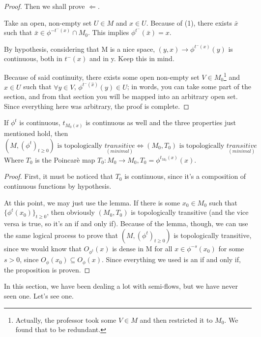 \begin{proof}
    Then we shall prove $\Leftarrow$.

    Take an open, non-empty set $U\in M$ and $x\in U$. Because of (1), there exists $\bar{x}$ such that $\bar{x}\in \phi^{-t^-(x)}\cap M_0$. This implies $\phi^{t^-}(\bar{x})=x$. 
    
    By hypothesis, considering that M is a nice space, $(y,x)\rightarrow\phi^{t^-(x)}(y)$ is continuous, both in $t^-(x)$ and in y. Keep this in mind.

    Because of said continuity, there exists some open non-empty set $V\in M_0$\footnote{Actually, the professor took some $V\in M$ and then restricted it to $M_0$. We found that to be redundant.} and $\hat{x}\in U$ such that $\forall y\in V$, $\phi^{t^-(\hat{x})}(y)\in U$; in words, you can take some part of the section, and from that section you will be mapped into an arbitrary open set. Since everything here was arbitrary, the proof is complete.
\end{proof}

\begin{proposition}
    If $\phi^t$ is continuous, $t_{M_0(x)}$ is continuous as well and the three properties just mentioned hold, then \begin{equation*}
        (M, (\phi^t)_{t\geq0})\text{ is topologically }\underset{(minimal)}{transitive}\iff (M_0, T_0)\text{ is topologically }\underset{(minimal)}{transitive}
    \end{equation*}
    Where $T_0$ is the Poincarè map $T_0:M_0\rightarrow M_0, T_0=\phi^{t_{M_0}(x)}(x)$.
\end{proposition}
\begin{proof}
    First, it must be noticed that $T_0$ is continuous, since it's a composition of continuous functions by hypothesis.

    At this point, we may just use the lemma. If there is some $x_0\in M_0$ such that $\{\phi^t(x_0)\}_{t\geq 0}$, then obviously $(M_0, T_0)$ is topologically transitive (and the vice versa is true, so it's an if and only if). Because of the lemma, though, we can use the same logical process to prove that $(M, (\phi^t)_{t\geq 0})$ is topologically transitive, since we would know that $O_{\phi^t}(x)$ is dense in M for all $x\in\phi^{-s}(x_0)$ for some $s>0$, since $O_{\phi}(x_0)\subseteq O_{\phi}(x)$. Since everything we used is an if and only if, the proposition is proven.
\end{proof}

In this section, we have been dealing a lot with semi-flows, but we have never seen one. Let's see one.

